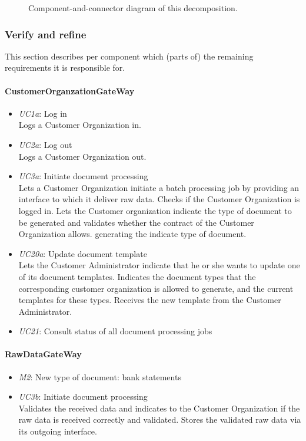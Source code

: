 \documentclass[a4paper,10pt]{article}
\begin{document}
\begin{figure}[!htp]
    \centering
    \caption{Component-and-connector diagram of this decomposition.
        }\label{fig:it1-cc_main}
\end{figure}

\subsubsection{Verify and refine}
This section describes per component which (parts of) the remaining
requirements it is responsible for.

\paragraph{CustomerOrganzationGateWay}
\begin{itemize}
    \item \emph{UC1a}: Log in\\ Logs a Customer Organization in.
    \item \emph{UC2a}: Log out\\ Logs a Customer Organization out.
    \item \emph{UC3a}: Initiate document processing\\ Lets a Customer Organization initiate a  batch processing job by providing an interface to which it deliver raw data. Checks if the Customer Organization is logged in. Lets the Customer organization indicate the type of document to be generated and validates whether the contract of the Customer Organization allows. generating the indicate type of document.
    \item \emph{UC20a}: Update document template\\ Lets the Customer Administrator indicate that he or she wants to update one of its document templates. Indicates the document types that the corresponding customer organization is allowed to generate, and the current templates for these types. Receives the new template from the Customer Administrator.
    \item \emph{UC21}: Consult status of all document processing jobs
\end{itemize}

\paragraph{RawDataGateWay}
\begin{itemize}
	\item \emph{M2}: New type of document: bank statements
    \item \emph{UC3b}: Initiate document processing\\ Validates the received data and indicates to the Customer Organization if the raw data is received correctly and validated. Stores the validated raw data via its outgoing interface.
\end{itemize}
\end{document}
